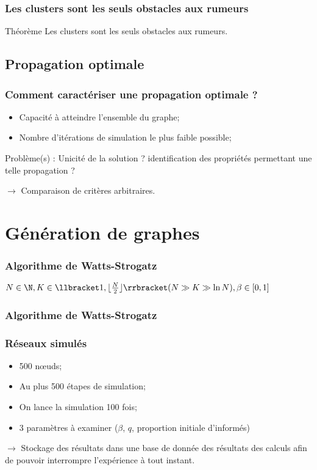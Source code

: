 \documentclass{beamer}
\newcommand{\illustration}[1]{
  \fontsize{8}{10}\selectfont
  \begin{center}
  
  \end{center}
}
\begin{document}
\begin{frame}
  \frametitle{Les clusters sont les seuls obstacles aux rumeurs}
  \begin{block}{Théorème}
    Les clusters sont les seuls obstacles aux rumeurs.
  \end{block}
\end{frame}

\subsection{Propagation optimale}
\begin{frame}
  \frametitle{Comment caractériser une propagation optimale ?}
  \begin{itemize}
    \item Capacité à atteindre l'ensemble du graphe;
    \item Nombre d'itérations de simulation le plus faible possible;
  \end{itemize}
    Problème(s) : Unicité de la solution ? identification des propriétés permettant une telle propagation ?

  $\rightarrow$ Comparaison de critères arbitraires.
\end{frame}

\section{Génération de graphes}
\begin{frame}
  \frametitle{Algorithme de Watts-Strogatz}
  \begin{center}
  $N \in \N, K \in \llbracket 1, \lfloor\frac{N}{2}\rfloor\rrbracket (N \gg K \gg \ln N), \beta \in [0,1]$
  \end{center}
\end{frame}
\begin{frame}
  \frametitle{Algorithme de Watts-Strogatz}
  \only<1-1>{\illustration{WS_1}}
  \only<2-2>{\illustration{WS_2}}
  \only<3-3>{\illustration{WS_3}}
  \only<4-4>{\illustration{WS_4}}
  \only<5-5>{\illustration{WS_5}}
\end{frame}


\begin{frame}
  \frametitle{Réseaux simulés}
  \begin{itemize}
    \item 500 nœuds;
    \item Au plus 500 étapes de simulation;
    \item On lance la simulation 100 fois;
    \item 3 paramètres à examiner ($\beta$, $q$, proportion initiale d'informés)
  \end{itemize}
  $\rightarrow$ Stockage des résultats dans une base de donnée des résultats des calculs afin de pouvoir interrompre l'expérience à tout instant.
\end{frame}
\end{document}
